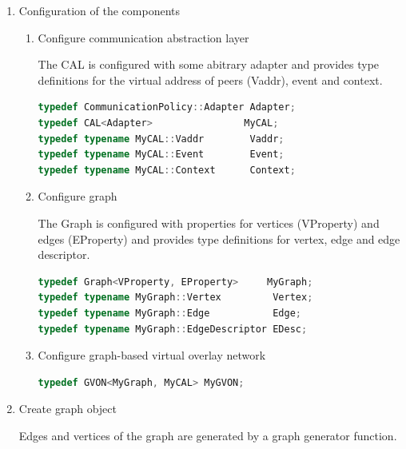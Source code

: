 \begin{enumerate}

\item Configuration of the components
\begin{enumerate}

\item Configure communication abstraction layer
  
  The CAL is configured with some abitrary adapter and provides type
  definitions for the virtual address of peers (Vaddr), event and
  context.

  \begin{lstlisting}[language=C++, label=lst:conf_cal]
typedef CommunicationPolicy::Adapter Adapter;
typedef CAL<Adapter>                MyCAL;
typedef typename MyCAL::Vaddr        Vaddr;
typedef typename MyCAL::Event        Event;
typedef typename MyCAL::Context      Context;
  \end{lstlisting}

\item Configure graph

  The Graph is configured with properties for vertices (VProperty) and
  edges (EProperty) and provides type definitions for vertex, edge and
  edge descriptor.

  \begin{lstlisting}[language=C++, label=lst:conf_graph]
typedef Graph<VProperty, EProperty>     MyGraph;
typedef typename MyGraph::Vertex         Vertex;
typedef typename MyGraph::Edge           Edge;
typedef typename MyGraph::EdgeDescriptor EDesc;
  \end{lstlisting}



\item Configure graph-based virtual overlay network

  \begin{lstlisting}[language=C++, label=lst:conf_gvon, style=types]
typedef GVON<MyGraph, MyCAL> MyGVON;
  \end{lstlisting}

\end{enumerate}

\item Create graph object

  Edges and vertices of the graph are generated by a graph generator function.


\end{enumerate}
